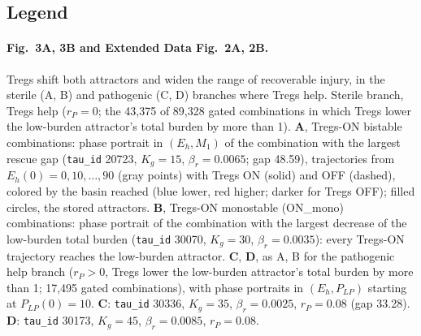 \documentclass[11pt]{article}
\begin{document}
\subsection{Legend}

\paragraph{Fig.~3A, 3B and Extended Data Fig.~2A, 2B.}
Tregs shift both attractors and widen the range of recoverable injury, in the sterile
(A, B) and pathogenic (C, D) branches where Tregs help. Sterile branch, Tregs help
($r_P = 0$; the 43,375 of 89,328 gated
combinations in which Tregs lower the low-burden attractor's total burden by more than 1).
\textbf{A}, Tregs-ON bistable combinations: phase portrait in $(E_h, M_1)$ of the
combination with the largest rescue gap (\texttt{tau\_id} 20723, $K_g = 15$,
$\beta_r = 0.0065$; gap 48.59), trajectories from $E_h(0) = 0, 10, \dots, 90$
(gray points) with Tregs ON (solid) and OFF (dashed), colored by the basin reached (blue
lower, red higher; darker for Tregs OFF); filled circles, the stored attractors.
\textbf{B}, Tregs-ON monostable (ON\_mono) combinations:
phase portrait of the combination with the largest decrease of the low-burden
total burden (\texttt{tau\_id} 30070, $K_g = 30$, $\beta_r = 0.0035$): every Tregs-ON
trajectory reaches the low-burden attractor.
\textbf{C}, \textbf{D}, as A, B for the pathogenic help branch ($r_P > 0$, Tregs lower the
low-burden attractor's total burden by more than 1; 17,495 gated combinations), with phase portraits in
$(E_h, P_{LP})$ starting at $P_{LP}(0) = 10$.
\textbf{C}: \texttt{tau\_id} 30336, $K_g = 35$, $\beta_r = 0.0025$, $r_P = 0.08$
(gap 33.28). \textbf{D}: \texttt{tau\_id} 30173, $K_g = 45$, $\beta_r = 0.0085$,
$r_P = 0.08$.
\end{document}
